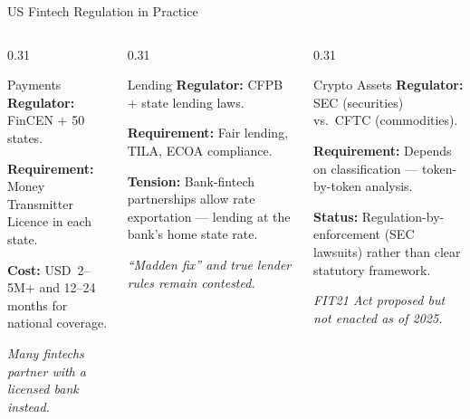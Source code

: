 \begin{frame}{US Fintech Regulation in Practice}
  \begin{columns}[T]
    \begin{column}{0.31\textwidth}
      \begin{block}{\centering Payments}
        \textbf{Regulator:} FinCEN + 50 states.

        \vspace{0.3em}
        \textbf{Requirement:} Money Transmitter Licence in each state.

        \vspace{0.3em}
        \textbf{Cost:} USD~2--5M+ and 12--24 months for national coverage.

        \vspace{0.3em}
        \textit{Many fintechs partner with a licensed bank instead.}
      \end{block}
    \end{column}
    \begin{column}{0.31\textwidth}
      \begin{block}{\centering Lending}
        \textbf{Regulator:} CFPB + state lending laws.

        \vspace{0.3em}
        \textbf{Requirement:} Fair lending, TILA, ECOA compliance.

        \vspace{0.3em}
        \textbf{Tension:} Bank-fintech partnerships allow rate exportation --- lending at the bank's home state rate.

        \vspace{0.3em}
        \textit{``Madden fix'' and true lender rules remain contested.}
      \end{block}
    \end{column}
    \begin{column}{0.31\textwidth}
      \begin{block}{\centering Crypto Assets}
        \textbf{Regulator:} SEC (securities) vs.\ CFTC (commodities).

        \vspace{0.3em}
        \textbf{Requirement:} Depends on classification --- token-by-token analysis.

        \vspace{0.3em}
        \textbf{Status:} Regulation-by-enforcement (SEC lawsuits) rather than clear statutory framework.

        \vspace{0.3em}
        \textit{FIT21 Act proposed but not enacted as of 2025.}
      \end{block}
    \end{column}
  \end{columns}
\end{frame}

